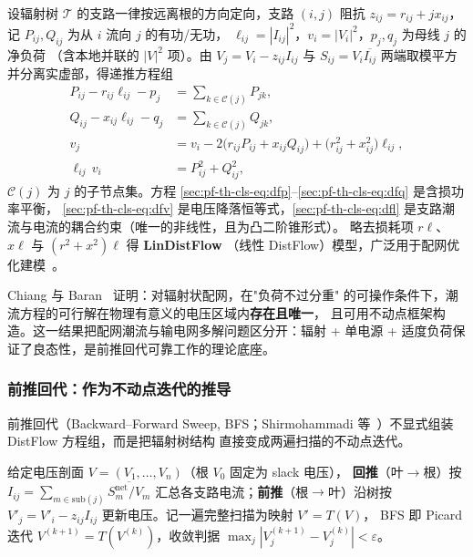 \begin{definition}\label{sec:pf-th-cls-def-distflow}
设辐射树 $\mathcal T$ 的支路一律按远离根的方向定向，支路 $(i,j)$ 阻抗
$z_{ij}=r_{ij}+jx_{ij}$，记 $P_{ij},Q_{ij}$ 为从 $i$ 流向 $j$ 的有功/无功，
$\ell_{ij}=|I_{ij}|^2$，$v_i=|V_i|^2$，$p_j,q_j$ 为母线 $j$ 的净负荷
（含本地并联的 $|V|^2$ 项）。由 $V_j=V_i-z_{ij}I_{ij}$ 与
$S_{ij}=V_i\overline{I_{ij}}$ 两端取模平方并分离实虚部，得递推方程组
\begin{align}
P_{ij}-r_{ij}\ell_{ij}-p_j&=\sum_{k\in\mathcal C(j)}P_{jk},
\label{sec:pf-th-cls-eq:dfp}\\
Q_{ij}-x_{ij}\ell_{ij}-q_j&=\sum_{k\in\mathcal C(j)}Q_{jk},
\label{sec:pf-th-cls-eq:dfq}\\
v_j&=v_i-2\bigl(r_{ij}P_{ij}+x_{ij}Q_{ij}\bigr)+\bigl(r_{ij}^2+x_{ij}^2\bigr)\ell_{ij},
\label{sec:pf-th-cls-eq:dfv}\\
\ell_{ij}\,v_i&=P_{ij}^2+Q_{ij}^2,
\label{sec:pf-th-cls-eq:dfl}
\end{align}
$\mathcal C(j)$ 为 $j$ 的子节点集。方程
\eqref{sec:pf-th-cls-eq:dfp}--\eqref{sec:pf-th-cls-eq:dfq} 是含损功率平衡，
\eqref{sec:pf-th-cls-eq:dfv} 是电压降落恒等式，\eqref{sec:pf-th-cls-eq:dfl}
是支路潮流与电流的耦合约束（唯一的非线性，且为凸二阶锥形式）。
略去损耗项 $r\ell$、$x\ell$ 与 $(r^2+x^2)\ell$ 得\textbf{ LinDistFlow}
（线性 DistFlow）模型，广泛用于配网优化建模~\cite{cls:baranwu}。
\end{definition}

\begin{remark}[存在唯一性]\label{sec:pf-th-cls-rem-chiang}
Chiang 与 Baran~\cite{cls:chiangbaran} 证明：对辐射状配网，在"负荷不过分重"
的可操作条件下，潮流方程的可行解在物理有意义的电压区域内\textbf{存在且唯一}，
且可用不动点框架构造。这一结果把配网潮流与输电网多解问题区分开：辐射 +
单电源 + 适度负荷保证了良态性，是前推回代可靠工作的理论底座。
\end{remark}

\subsubsection{前推回代：作为不动点迭代的推导}

前推回代（Backward--Forward Sweep, BFS；Shirmohammadi
等~\cite{cls:shirmohammadi}）不显式组装 DistFlow 方程组，而是把辐射树结构
直接变成两遍扫描的不动点迭代。

\begin{definition}\label{sec:pf-th-cls-def-bfs}
给定电压剖面 $V=(V_1,\dots,V_n)$（根 $V_0$ 固定为 slack 电压），
\textbf{回推}（叶$\to$根）按
$I_{ij}=\sum_{m\in\mathrm{sub}(j)}\overline{S_m^{\mathrm{net}}/V_m}$
汇总各支路电流；\textbf{前推}（根$\to$叶）沿树按
$V'_j=V'_i-z_{ij}I_{ij}$ 更新电压。记一遍完整扫描为映射 $V'=T(V)$，
BFS 即 Picard 迭代 $V^{(k+1)}=T(V^{(k)})$，收敛判据
$\max_j|V_j^{(k+1)}-V_j^{(k)}|<\varepsilon$。
\end{definition}


